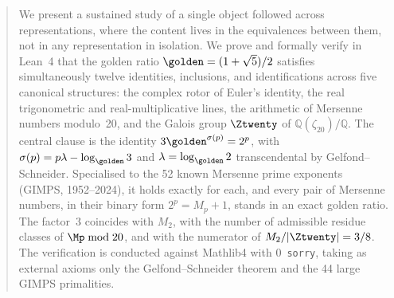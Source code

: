 
\begin{abstract}
We present a sustained study of a single object followed across
representations, where the content lives in the equivalences between them,
not in any representation in isolation.  We prove and formally verify in
Lean~4 that the golden ratio
$\golden=(1+\sqrt5)/2$ satisfies simultaneously twelve identities,
inclusions, and identifications across five canonical structures: the
complex rotor of Euler's identity, the real trigonometric and
real-multiplicative lines, the arithmetic of Mersenne numbers
modulo~20, and the Galois group $\Ztwenty$ of
$\mathbb{Q}(\zeta_{20})/\mathbb{Q}$. The central clause is the identity
$3\golden^{\sigma(p)}=2^{p}$, with $\sigma(p)=p\lambda-\log_\golden 3$
and $\lambda=\log_\golden 2$ transcendental by Gelfond--Schneider.
Specialised to the 52 known Mersenne prime exponents (GIMPS,
1952--2024), it holds exactly for each, and every pair of Mersenne
numbers, in their binary form $2^{p}=M_{p}+1$, stands in an exact golden
ratio. The factor~3 coincides with
$M_{2}$, with the number of admissible residue classes of
$\Mp\bmod 20$, and with the numerator of $M_{2}/|\Ztwenty|=3/8$. The
verification is conducted against Mathlib4 with $0$~\texttt{sorry}, taking as external
axioms only the Gelfond--Schneider theorem and the 44 large GIMPS
primalities.
\end{abstract}

\maketitle
